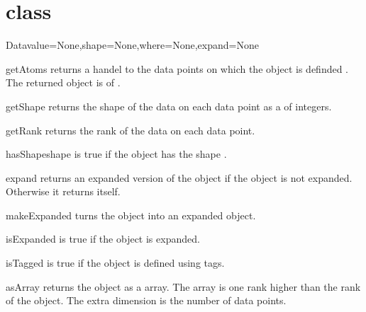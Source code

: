 \section{\Data class}
\begin{classdesc}{Data}{value=None,shape=None,where=None,expand=None}
\end{classdesc}

\begin{methoddesc}[Data]{getAtoms}{}
returns a handel to the data points on which the object is definded
.  The returned object is of .
\end{methoddesc}

\begin{methoddesc}[Data]{getShape}{}
returns the shape of the data on each data point as a  of
integers. 
\end{methoddesc}

\begin{methoddesc}[Data]{getRank}{}
returns the rank of the data on each data point. 
\end{methoddesc}

\begin{methoddesc}[Data]{hasShape}{shape}
is true if the object has the shape .
\end{methoddesc}

\begin{methoddesc}[Data]{expand}{}
returns an expanded version of the object if the object is not
expanded. Otherwise it returns itself. 
\end{methoddesc}

\begin{methoddesc}[Data]{makeExpanded}{}
turns the object into an expanded \Data
object. 
\end{methoddesc}

\begin{methoddesc}[Data]{isExpanded}{}
is true if the object is expanded. 
\end{methoddesc}

\begin{methoddesc}[Data]{isTagged}{}
is true if the object is defined using tags. 
\end{methoddesc}

\begin{methoddesc}[Data]{asArray}{}
returns the object as a  array. The array is one
rank higher than the rank of the object. The extra dimension is the
number of data points.
\end{methoddesc}

